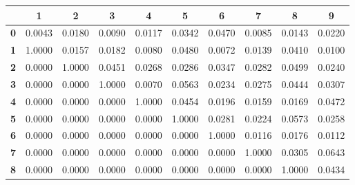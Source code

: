\begin{tiny}\begin{tabular}{|l|c|c|c|c|c|c|c|c|c|}
\hline
&\textbf{1}&\textbf{2}&\textbf{3}&\textbf{4}&\textbf{5}&\textbf{6}&\textbf{7}&\textbf{8}&\textbf{9}\\\hline
\textbf{0}&0.0043&0.0180&0.0090&0.0117&0.0342&0.0470&0.0085&0.0143&0.0220\\\hline
\textbf{1}&1.0000&0.0157&0.0182&0.0080&0.0480&0.0072&0.0139&0.0410&0.0100\\\hline
\textbf{2}&0.0000&1.0000&0.0451&0.0268&0.0286&0.0347&0.0282&0.0499&0.0240\\\hline
\textbf{3}&0.0000&0.0000&1.0000&0.0070&0.0563&0.0234&0.0275&0.0444&0.0307\\\hline
\textbf{4}&0.0000&0.0000&0.0000&1.0000&0.0454&0.0196&0.0159&0.0169&0.0472\\\hline
\textbf{5}&0.0000&0.0000&0.0000&0.0000&1.0000&0.0281&0.0224&0.0573&0.0258\\\hline
\textbf{6}&0.0000&0.0000&0.0000&0.0000&0.0000&1.0000&0.0116&0.0176&0.0112\\\hline
\textbf{7}&0.0000&0.0000&0.0000&0.0000&0.0000&0.0000&1.0000&0.0305&0.0643\\\hline
\textbf{8}&0.0000&0.0000&0.0000&0.0000&0.0000&0.0000&0.0000&1.0000&0.0434\\\hline
\end{tabular}
\end{tiny}